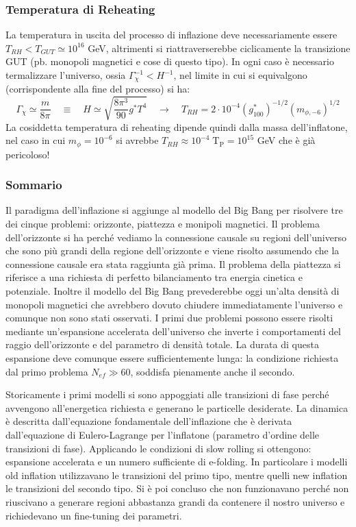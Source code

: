 \subsubsection{Temperatura di Reheating}
La temperatura in uscita del processo di inflazione deve necessariamente essere $T_{RH}<T_{GUT}\simeq 10^{16}$ GeV, altrimenti si riattraverserebbe ciclicamente la transizione GUT (pb. monopoli magnetici e cose di questo tipo). In ogni caso è necessario termalizzare l'universo, ossia $\Gamma_\chi^{-1}<H^{-1}$, nel limite in cui si equivalgono (corrispondente alla fine del processo) si ha:
\begin{equation}
    \Gamma_\chi \simeq \frac{m}{8\pi} \quad\equiv\quad H \simeq \sqrt{\frac{8\pi^3}{90}g^* T^4}\quad \rightarrow \quad T_{RH} = 2\cdot 10^{-4} \left( g^*_{100} \right)^{-1/2} \left( m_{\phi, -6} \right)^{1/2}
\end{equation}
La cosiddetta temperatura di reheating dipende quindi dalla massa dell'inflatone, nel caso in cui $m_\phi = 10^{-6}$ si avrebbe $T_{RH}\approx 10^{-4}\;\mathrm{T_P}=10^{15}$ GeV che è già pericoloso! 

\newpage
\subsubsection{Sommario}
Il paradigma dell'inflazione si aggiunge al modello del Big Bang per risolvere tre dei cinque problemi: orizzonte, piattezza e monipoli magnetici. Il problema dell'orizzonte si ha perché vediamo la connessione causale su regioni dell'universo che sono più grandi della regione dell'orizzonte e viene risolto assumendo che la connessione causale era stata raggiunta già prima. Il problema della piattezza si riferisce a una richiesta di perfetto bilanciamento tra energia cinetica e potenziale. Inoltre il modello del Big Bang prevederebbe oggi un'alta densità di monopoli magnetici che avrebbero dovuto chiudere immediatamente l'universo e comunque non sono stati osservati. I primi due problemi possono essere risolti mediante un'espansione accelerata dell'universo che inverte i comportamenti del raggio dell'orizzonte e del parametro di densità totale. La durata di questa espansione deve comunque essere sufficientemente lunga: la condizione richiesta dal primo problema $N_{ef} \gg 60$, soddisfa pienamente anche il secondo. 

Storicamente i primi modelli si sono appoggiati alle transizioni di fase perché avvengono all'energetica richiesta e generano le particelle desiderate. La dinamica è descritta dall'equazione fondamentale dell'inflazione che è derivata dall'equazione di Eulero-Lagrange per l'inflatone (parametro d'ordine delle transizioni di fase). Applicando le condizioni di slow rolling si ottengono: espansione accelerata e un numero sufficiente di e-folding. In particolare i modelli old inflation utilizzavano le transizioni del primo tipo, mentre quelli new inflation le transizioni del secondo tipo. Si è poi concluso che non funzionavano perché non riuscivano a generare regioni abbastanza grandi da contenere il nostro universo e richiedevano un fine-tuning dei parametri.

